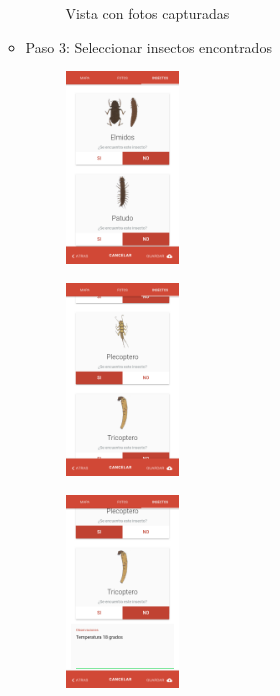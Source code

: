 \begin{itemize}
\begin{itemize}
\begin{figure}
											\caption{Vista con fotos capturadas}
									\label{fig:registroPaso2B}
							\end{figure}

						\item Paso 3: Seleccionar insectos encontrados
							\begin{figure}
									\includegraphics[width=0.3\textwidth]{Screenshots/registroPaso3A.png}
									\label{fig:registroPaso3A}
							\end{figure}
							\begin{figure}
									\includegraphics[width=0.3\textwidth]{Screenshots/registroPaso3B.png}
									\label{fig:registroPaso3B}
							\end{figure}
							\begin{figure}
									\includegraphics[width=0.3\textwidth]{Screenshots/registroPaso3C.png}

\end{figure}
\end{itemize}
\end{itemize}
